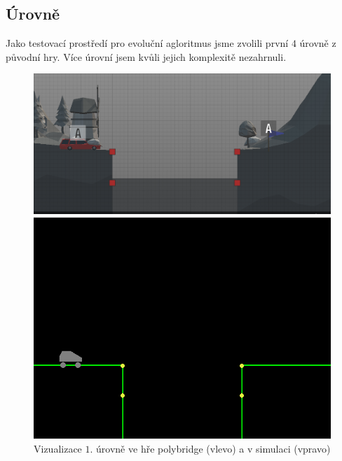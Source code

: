 \subsection{Úrovně}

Jako testovací prostředí pro evoluční agloritmus jsme zvolili první $4$ úrovně z původní hry. Více úrovní jsem kvůli jejich komplexitě nezahrnuli.

\begin{figure}[ht]
    \centering
    \begin{minipage}{0.49\textwidth}
        \centering
        \includegraphics[width=\linewidth]{img/poly_lvl1.png}
    \end{minipage}\hfill
    \begin{minipage}{0.49\textwidth}
        \centering
        \includegraphics[width=\linewidth]{img/impl_lvl1.png}
    \end{minipage}
    \caption{Vizualizace $1.$ úrovně ve hře polybridge (vlevo) a v simulaci (vpravo)}
    \label{impl-fig:2}
\end{figure}

